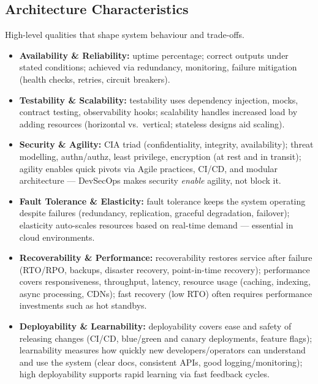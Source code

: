 \documentclass[hidelinks]{article}
\begin{document}
\subsection{Architecture Characteristics}
High-level qualities that shape system behaviour and trade-offs.
\begin{itemize}
  \item \textbf{Availability \& Reliability:} uptime percentage; correct outputs under stated conditions;
        achieved via redundancy, monitoring, failure mitigation (health checks, retries, circuit breakers).
  \item \textbf{Testability \& Scalability:} testability uses dependency injection, mocks, contract testing,
        observability hooks; scalability handles increased load by adding resources (horizontal vs.\
        vertical; stateless designs aid scaling).
  \item \textbf{Security \& Agility:} CIA triad (confidentiality, integrity, availability); threat modelling,
        authn/authz, least privilege, encryption (at rest and in transit); agility enables quick pivots via
        Agile practices, CI/CD, and modular architecture --- DevSecOps makes security \emph{enable}
        agility, not block it.
  \item \textbf{Fault Tolerance \& Elasticity:} fault tolerance keeps the system operating despite failures
        (redundancy, replication, graceful degradation, failover); elasticity auto-scales resources based
        on real-time demand --- essential in cloud environments.
  \item \textbf{Recoverability \& Performance:} recoverability restores service after failure (RTO/RPO,
        backups, disaster recovery, point-in-time recovery); performance covers responsiveness,
        throughput, latency, resource usage (caching, indexing, async processing, CDNs); fast recovery
        (low RTO) often requires performance investments such as hot standbys.
  \item \textbf{Deployability \& Learnability:} deployability covers ease and safety of releasing changes
        (CI/CD, blue/green and canary deployments, feature flags); learnability measures how quickly
        new developers/operators can understand and use the system (clear docs, consistent APIs, good
        logging/monitoring); high deployability supports rapid learning via fast feedback cycles.
\end{itemize}
\end{document}

